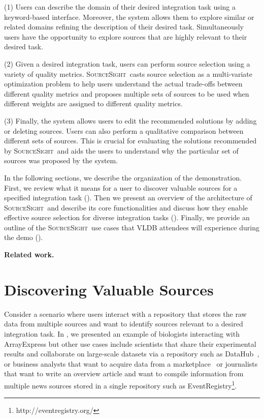 \documentclass{vldb}
\newcommand\system{\textsc{SourceSight}}
\begin{document}
\vspace{2pt}\noindent (1) Users can describe the domain of their desired integration task using a keyword-based interface. Moreover, the system allows them to explore similar or related domains refining the description of their desired task. Simultaneously users have the opportunity to explore sources that are highly relevant to their desired task.

\vspace{2pt}\noindent (2) Given a desired integration task, users can perform source selection using a variety of quality metrics. \system~casts source selection as a multi-variate optimization problem to help users understand the actual trade-offs between different quality metrics and proposes multiple sets of sources to be used when different weights are assigned to different quality metrics. 

\vspace{2pt}\noindent (3) Finally, the system allows users to edit the recommended solutions by adding or deleting sources. Users can also perform a qualitative comparison between different sets of sources. This is crucial for evaluating the solutions recommended by \system~and aids the users to understand why the particular set of sources was proposed by the system.

In the following sections, we describe the organization of the demonstration. First, we review what it means for a user to discover valuable sources for a specified integration task (). Then we present an overview of the architecture of \system~and describe its core functionalities and discuss how they enable effective source selection for diverse integration tasks (). Finally, we provide an outline of the \system~use cases that VLDB attendees will experience during the demo ().

\vspace{2pt}\noindent\textbf{Related work.}

\section{Discovering Valuable Sources}
\label{sec:sources}
Consider a scenario where users interact with a repository that stores the raw data from multiple sources and want to identify sources relevant to a desired integration task. In , we presented an example of biologists interacting with ArrayExpress but other use cases include scientists that share their experimental results and collaborate on large-scale datasets via a repository such as DataHub~\cite{datahub}, or business analysts that want to acquire data from a marketplace~\cite{balazinska:vldb11} or journalists that want to write an overview article and want to compile information from multiple news sources stored in a single repository such as EventRegistry\footnote{http://eventregistry.org/}. 
\end{document}
